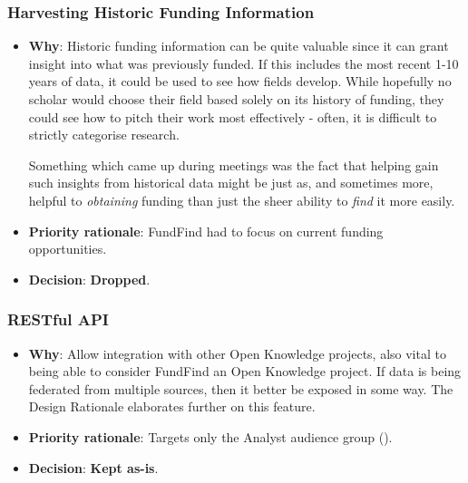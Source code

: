 \subsubsection{Harvesting Historic Funding Information}
\begin{itemize}
 \item \textbf{Why}: Historic funding information can be quite valuable since it can grant insight into what was previously funded. If this includes the most recent 1-10 years of data, it could be used to see how fields develop. While hopefully no scholar would choose their field based solely on its history of funding, they could see how to pitch their work most effectively - often, it is difficult to strictly categorise research.
 
 Something which came up during meetings was the fact that helping gain such insights from historical data might be just as, and sometimes more, helpful to \emph{obtaining} funding than just the sheer ability to \emph{find} it more easily.
 \item \textbf{Priority rationale}: FundFind had to focus on current funding opportunities.
 \item \textbf{Decision}: \textbf{Dropped}.
\end{itemize}

\subsubsection{RESTful API}
\begin{itemize}
 \item \textbf{Why}: Allow integration with other Open Knowledge projects, also vital to being able to consider FundFind an Open Knowledge project. If data is being federated from multiple sources, then it better be exposed in some way. The Design Rationale  elaborates further on this feature.
 \item \textbf{Priority rationale}: Targets only the Analyst audience group ().
 \item \textbf{Decision}: \textbf{Kept as-is}.
\end{itemize}

